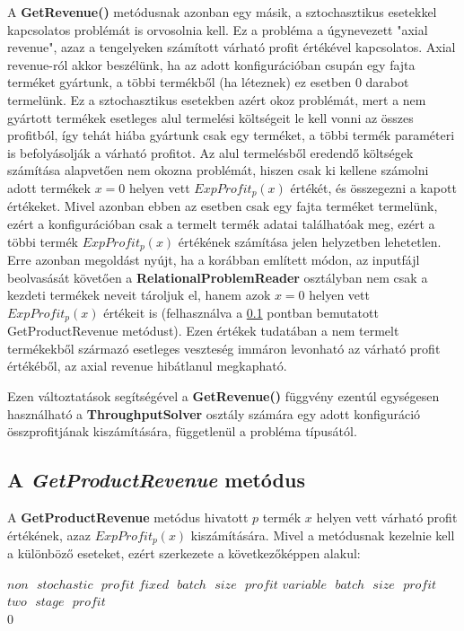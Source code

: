A \textbf{GetRevenue()} metódusnak azonban egy másik, a sztochasztikus esetekkel kapcsolatos problémát is orvosolnia kell. Ez a probléma a úgynevezett "axial revenue", azaz a tengelyeken számított várható profit értékével kapcsolatos. Axial revenue-ról akkor beszélünk, ha az adott konfigurációban csupán egy fajta terméket gyártunk, a többi termékből (ha léteznek) ez esetben 0 darabot termelünk. Ez a sztochasztikus esetekben azért okoz problémát, mert a nem gyártott termékek esetleges alul termelési költségeit le kell vonni az összes profitból, így tehát hiába gyártunk csak egy terméket, a többi termék paraméteri is befolyásolják a várható profitot. Az alul termelésből eredendő költségek számítása alapvetően nem okozna problémát, hiszen csak ki kellene számolni adott termékek $x=0$ helyen vett $ExpProfit_p(x)$ értékét, és összegezni a kapott értékeket. Mivel azonban ebben az esetben csak egy fajta terméket termelünk, ezért a konfigurációban csak a termelt termék adatai találhatóak meg, ezért a többi termék $ExpProfit_p(x)$ értékének számítása jelen helyzetben lehetetlen. Erre azonban megoldást nyújt, ha a korábban említett módon, az inputfájl beolvasását követően a \textbf{RelationalProblemReader} osztályban nem csak a kezdeti termékek neveit tároljuk el, hanem azok $x=0$ helyen vett $ExpProfit_p(x)$ értékeit is (felhasználva a \ref{getProductRevenue} pontban bemutatott GetProductRevenue metódust). Ezen értékek tudatában a nem termelt termékekből származó esetleges veszteség immáron levonható az várható profit értékéből, az axial revenue hibátlanul megkapható.

Ezen változtatások segítségével a \textbf{GetRevenue()} függvény ezentúl egységesen használható a \textbf{ThroughputSolver} osztály számára egy adott konfiguráció összprofitjának kiszámítására, függetlenül a probléma típusától. 
\subsection{A \textit{GetProductRevenue} metódus} \label{getProductRevenue}
A \textbf{GetProductRevenue} metódus hivatott $p$ termék $x$ helyen vett várható profit értékének, azaz $ExpProfit_p(x)$ kiszámítására. Mivel a metódusnak kezelnie kell a különböző eseteket, ezért szerkezete a következőképpen alakul: 
\begin{algorithmic}
 \Return $non \text{ } stochastic \text{ } profit$
\EndIf
{} \Return $fixed \text{ } batch \text{ } size \text{ } profit$
\EndIf
{} \Return $variable \text{ } batch \text{ } size \text{ } profit$
\EndIf
{} \Return $two \text{ } stage \text{ } profit$
\EndIf\\
\Return $0$
\EndProcedure
\end{algorithmic}



